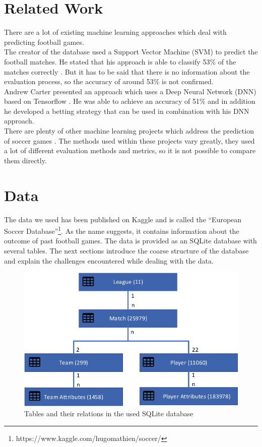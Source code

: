 \documentclass[a4paper]{article}
\begin{document}
\section{Related Work} \label{relatedwork}
There are a lot of existing machine learning approaches which deal with
predicting football games.
\\
The creator of the database used a Support Vector Machine (SVM) to predict the
football matches. He stated that his approach is able to classify 53\% of the
matches correctly \cite{SVM-Kaggle}. But it has to be said that there is no
information about the evaluation process, so the accuracy of around 53\% is not
confirmed.
\\
Andrew Carter presented an approach which uses a Deep Neural Network (DNN) based
on Tensorflow \cite{DeepLTensor}. He was able to achieve an accuracy of 51\% and
in addition he developed a betting strategy that can be used in combination with
his DNN approach.
\\
There are plenty of other machine learning projects which address the prediction
of soccer games \cite{MLFramework1, MLFramework2}. The methods used within these
projects vary greatly, they used a lot of different evaluation methods and
metrics, so it is not possible to compare them directly.

\section{Data} \label{data}
The data we used has been published on Kaggle and is called the ``European
Soccer Database''\footnote{https://www.kaggle.com/hugomathien/soccer/}. As the
name suggests, it contains information about the outcome of past football games.
The data is provided as an SQLite database with several tables. The next
sections introduce the coarse structure of the database and explain the
challenges encountered while dealing with the data.

\begin{figure}[!htbp]
	\centering
    \includegraphics[scale=0.8]{img/table-layout-nn}
	\caption{Tables and their relations in the used SQLite database}
	\label{fig:data}
\end{figure}
\end{document}
